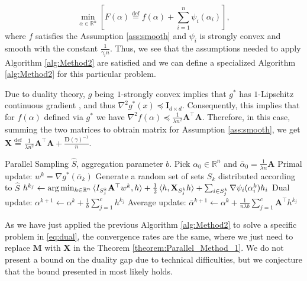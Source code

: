 \documentclass[11pt]{article}
\newcommand{\bM}{\mathbf{M}}
\newcommand{\bA}{\mathbf{A}}
\newcommand{\bD}{\mathbf{D}}
\newcommand{\bX}{\mathbf{X}}
\newcommand{\eqdef}{\overset{\text{def}}{=}}
\renewcommand{\algorithmicrequire}{\textbf{Parameters:}}
\renewcommand{\algorithmicensure}{\textbf{Initialization:}}
\begin{document}
	\begin{equation}
		\min_{\alpha \in \mathbb{R}^n} \left[ F(\alpha) \eqdef f(\alpha) + \sum_{i=1}^{n} \psi_i(\alpha_i)\right],
	\end{equation}
	where $f$ satisfies the Assumption \ref{ass:smooth} and $\psi_i$ is strongly convex and smooth with the constant $\frac{1}{\gamma_i n}$. Thus, we see that the assumptions needed to apply Algorithm \ref{alg:Method2} are satisfied and we can define a specialized Algorithm \ref{alg:Method2} for this particular problem. 
	
	 Due to duality theory, $g$ being $1$-strongly convex implies that $g^*$ has $1$-Lipschitz continuous gradient \cite{Duenner2016}, and thus $\nabla^2 g^*(x) \preceq \mathbf{I}_{d\times d}$. Consequently, this implies that for $f(\alpha)$ defined via $g^*$ we have $\nabla^2 f(\alpha) \preceq \frac{1}{\lambda n^2} \mathbf{A}^\top\mathbf{A}$. Therefore, in this case, summing the two matrices to obtrain matrix for Assumption \ref{ass:smooth}, we get $\bX \eqdef \frac{1}{\lambda n^2} \mathbf{A}^\top\mathbf{A} +  \frac{\bD(\gamma)^{-1}}{n} $.
	
	\begin{algorithm}
		\caption{PSN: Parallel Stochastic Netwon for ERM}
		\label{alg:Method2}
		\renewcommand{\algorithmicrequire}{\textbf{Parameters:}}
		\renewcommand{\algorithmicensure}{\textbf{Initialization:}}
		\begin{algorithmic}[1]
			\Require Parallel Sampling $\hat{S}$, aggregation parameter $b$. 
			\Ensure Pick $\alpha_0 \in \mathbb{R}^n$ and $\bar{\alpha}_0 = \frac{1}{\lambda n } \mathbf{A}$
			\State Primal update: $w^k = \nabla g^*(\bar{\alpha}_k)$
			\State Generate a random set of sets $S_{k}$ distributed according to $\hat{S}$
			\State $h^{k_j} \leftarrow \arg\min _{h \in \mathbb{R}^n} \braket{I_{S^k_j}\mathbf{A}^\top w^k,h} + \frac{1}{2}\braket{h,\mathbf{X}_{S^k_j}h} + \sum_{i \in S^k_j} \nabla \psi_i(\alpha^k_i)h_i$
			\EndFor
			\State Dual update:    $\alpha^{k+1} \leftarrow \alpha^k + \frac{1}{b}\sum_{j=1}^{c} h^{k_j}$ 
			\State Average update: $\bar{\alpha}^{k+1} \leftarrow \alpha^k + \frac{1}{n\lambda b} \sum_{j=1}^{c} \bA^\top h^{k_j}$
			\EndFor
			
		\end{algorithmic}
	\end{algorithm}
	As we have just applied the previous Algorithm \ref{alg:Method2} to solve a specific problem in \eqref{eq:dual}, the convergence rates are the same, where we just need to replace $\bM$ with $\bX$ in the Theorem \ref{theorem:Parallel_Method_1}. We do not present a bound on the duality gap due to technical difficulties, but we conjecture that the bound presented in \cite{SDNA} most likely holds. 
	
\end{document}
